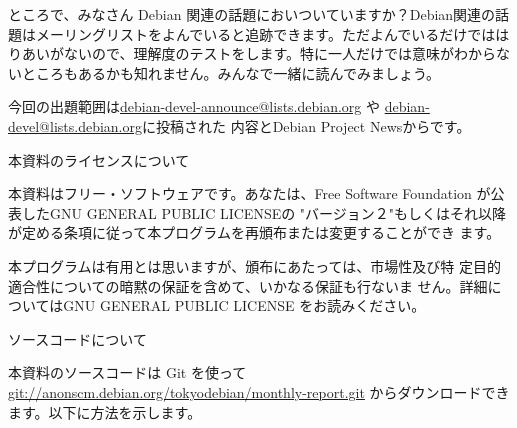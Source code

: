 \documentclass[mingoth,a4paper]{jsarticle}
\begin{document}
ところで、みなさん Debian 関連の話題においついていますか？Debian関連の話
題はメーリングリストをよんでいると追跡できます。ただよんでいるだけではは
りあいがないので、理解度のテストをします。特に一人だけでは意味がわからな
いところもあるかも知れません。みんなで一緒に読んでみましょう。

今回の出題範囲は\url{debian-devel-announce@lists.debian.org} や \url{debian-devel@lists.debian.org}に投稿された
内容とDebian Project Newsからです。

\small
\begin{multicols}{2}





\end{multicols}
\normalsize


\newpage

\begin{center}
本資料のライセンスについて
\end{center}

\begin{fontsize}{6}{6}

本資料はフリー・ソフトウェアです。あなたは、Free Software
Foundation が公表したGNU GENERAL PUBLIC LICENSEの "バージョン２"もしくはそれ以降
が定める条項に従って本プログラムを再頒布または変更することができ
ます。

本プログラムは有用とは思いますが、頒布にあたっては、市場性及び特
定目的適合性についての暗黙の保証を含めて、いかなる保証も行ないま
せん。詳細についてはGNU GENERAL PUBLIC LICENSE をお読みください。

\end{fontsize}

\begin{center}
ソースコードについて
\end{center}

本資料のソースコードは Git を使って\url{git://anonscm.debian.org/tokyodebian/monthly-report.git}
からダウンロードできます。以下に方法を示します。

\end{document}
